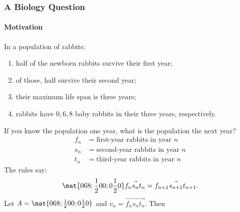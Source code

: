 

\usetikzlibrary{shadows,shapes}




\begin{frame}
\frametitle{A Biology Question}
\framesubtitle{Motivation}

In a population of rabbits:
\begin{enumerate}
\item half of the newborn rabbits survive their first year;
  \pause
\item of those, half survive their second year;
  \pause
\item their maximum life span is three years;
  \pause
\item rabbits have $0, 6, 8$ baby rabbits in their three years, respectively.
\end{enumerate}
\pause
If you know the population one year, what is the population the next year?
\pause
\[\begin{split}
  f_n &= \text{first-year rabbits in year $n$} \\
  s_n &= \text{second-year rabbits in year $n$} \\
  t_n &= \text{third-year rabbits in year $n$} 
\end{split}\]
\pause
The rules say:
\[ \mat{0 6 8; \frac 12 0 0; 0 \frac 12 0}\vec{f_n s_n t_n} 
= \vec{f_{n+1} s_{n+1} t_{n+1}}. \]
\pause
Let $A = \mat{0 6 8; \frac 12 0 0; 0 \frac 12 0}$ and
$v_n = \vec{f_n s_n t_n}$.  Then\,
\pause
{}

\end{frame}



